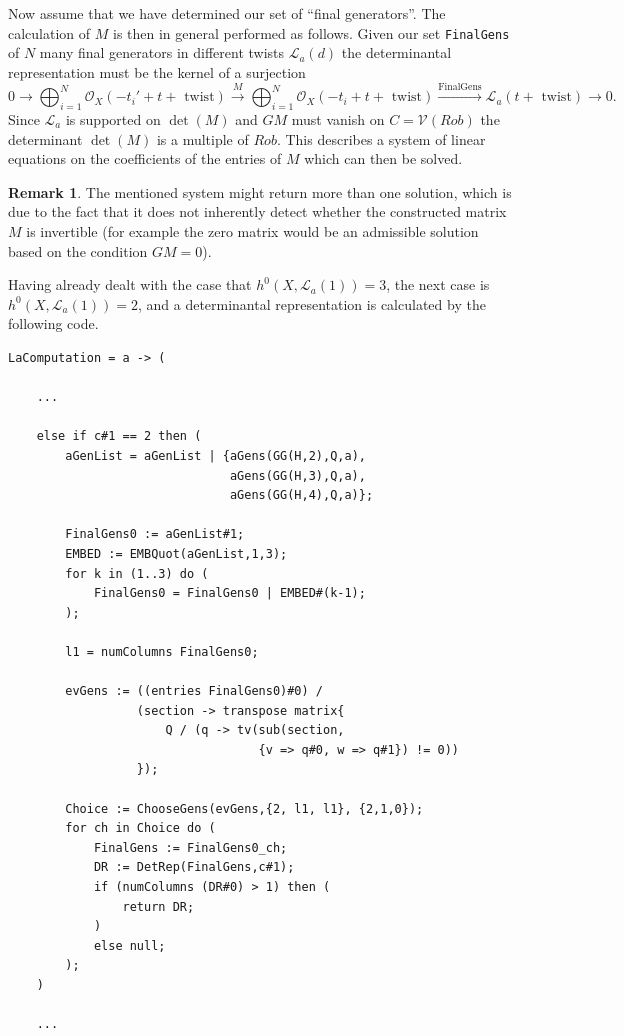 \documentclass[a4paper,10pt]{amsart}
\theoremstyle{definition}
\newtheorem{rem}[Def]{Remark}
\theoremstyle{plain}
\newcommand{\cL}{{\mathcal L}}
\newcommand{\cO}{{\mathcal O}}
\newcommand{\cV}{{\mathcal V}}
\begin{document}
Now assume that we have determined our set of ``final generators''. The calculation of $M$ is then in general performed as follows. Given our set \texttt{FinalGens} of $N$ many final generators in different twists $\cL_a(d)$ the determinantal representation must be the kernel of a surjection
\begin{equation*}
    0 \to \bigoplus_{i=1}^N \cO_X(-t_i' + t + \text{ twist}) \overset{M}{\to} \bigoplus_{i=1}^N \cO_X(-t_i + t + \text{ twist}) \overset{\text{FinalGens}}{\to} \cL_a(t + \text{ twist}) \to 0.
\end{equation*}
Since $\cL_a$ is supported on $\det(M)$ and $GM$ must vanish on $C = \cV(Rob)$ the determinant $\det(M)$ is a multiple of $Rob$. This describes a system of linear equations on the coefficients of the entries of $M$ which can then be solved.

\begin{rem}
    The mentioned system might return more than one solution, which is due to the fact that it does not inherently detect whether the constructed matrix $M$ is invertible (for example the zero matrix would be an admissible solution based on the condition $GM = 0$).
\end{rem}

Having already dealt with the case that $h^0(X, \cL_a(1)) = 3$, the next case is $h^0(X, \cL_a(1)) = 2$, and a determinantal representation is calculated by the following code.

\begin{oframed}
\begin{verbatim}
LaComputation = a -> (
    
    ...
    
    else if c#1 == 2 then (
        aGenList = aGenList | {aGens(GG(H,2),Q,a),
                               aGens(GG(H,3),Q,a),
                               aGens(GG(H,4),Q,a)};

        FinalGens0 := aGenList#1;
        EMBED := EMBQuot(aGenList,1,3);
        for k in (1..3) do (
            FinalGens0 = FinalGens0 | EMBED#(k-1);
        );

        l1 = numColumns FinalGens0;

        evGens := ((entries FinalGens0)#0) /
                  (section -> transpose matrix{
                      Q / (q -> tv(sub(section,
                                   {v => q#0, w => q#1}) != 0))
                  });
        
        Choice := ChooseGens(evGens,{2, l1, l1}, {2,1,0});
        for ch in Choice do (
            FinalGens := FinalGens0_ch;
            DR := DetRep(FinalGens,c#1);
            if (numColumns (DR#0) > 1) then (
                return DR;
            )
            else null;
        );
    )

    ...
\end{verbatim}
\end{oframed}
\end{document}
